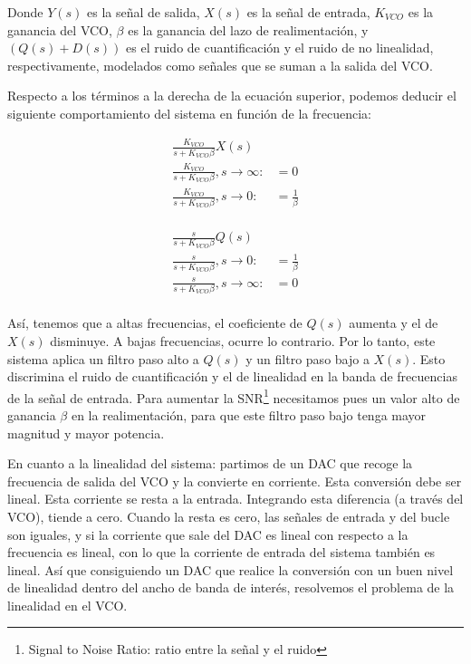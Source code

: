 \documentclass[12pt]{report} %
\begin{document}
	Donde $Y(s)$ es la señal de salida, $X(s)$ es la señal de entrada, $K_{VCO}$ es la ganancia del VCO, $\beta$ es la ganancia del lazo de realimentación, y $( Q(s) + D(s) )$ es el ruido de cuantificación y el ruido de no linealidad, respectivamente, modelados como señales que se suman a la salida del VCO.
	
	Respecto a los términos a la derecha de la ecuación superior, podemos deducir el siguiente comportamiento del sistema en función de la frecuencia:
	
	\begin{figure}[H]
		\label{vco-closed-loop-terms-x}
		\begin{equation}
		\begin{array}{lcl}
		\frac{K_{VCO}}{s + K_{VCO}\beta}X(s) & \\
		\frac{K_{VCO}}{s + K_{VCO}\beta}, s \to \infty: & = 0 \\
		\frac{K_{VCO}}{s + K_{VCO}\beta}, s \to 0: & = \frac{1}{\beta} \\
		\end{array}
		\end{equation}
	\end{figure}

	\begin{figure}[H]
		\label{vco-closed-loop-terms-q}
		\begin{equation}
		\begin{array}{lcl}
		\frac{s}{s + K_{VCO}\beta}Q(s) & \\
		\frac{s}{s + K_{VCO}\beta}, s \to 0: & = \frac{1}{\beta} \\
		\frac{s}{s + K_{VCO}\beta}, s \to \infty: & = 0 \\
		\end{array}
		\end{equation}
	\end{figure}

	Así, tenemos que a altas frecuencias, el coeficiente de $Q(s)$ aumenta y el de $X(s)$ disminuye. A bajas frecuencias, ocurre lo contrario. Por lo tanto, este sistema aplica un filtro paso alto a $Q(s)$ y un filtro paso bajo a $X(s)$. Esto discrimina el ruido de cuantificación y el de linealidad en la banda de frecuencias de la señal de entrada. Para aumentar la SNR\footnote{Signal to Noise Ratio: ratio entre la señal y el ruido} necesitamos pues un valor alto de ganancia $\beta$ en la realimentación, para que este filtro paso bajo tenga mayor magnitud y mayor potencia.
	
	En cuanto a la linealidad del sistema: partimos de un DAC que recoge la frecuencia de salida del VCO y la convierte en corriente. Esta conversión debe ser lineal. Esta corriente se resta a la entrada. Integrando esta diferencia (a través del VCO), tiende a cero. Cuando la resta es cero, las señales de entrada y del bucle son iguales, y si la corriente que sale del DAC es lineal con respecto a la frecuencia es lineal, con lo que la corriente de entrada del sistema también es lineal.  Así que consiguiendo un DAC que realice la conversión con un buen nivel de linealidad dentro del ancho de banda de interés, resolvemos el problema de la linealidad en el VCO.
	
\end{document}
